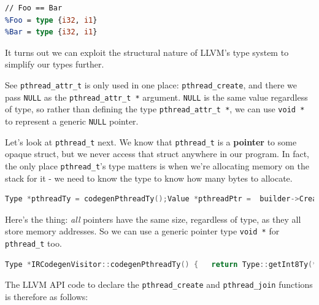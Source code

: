 
\begin{lstlisting}[language=llvm]
// Foo == Bar
%Foo = type {i32, i1}
%Bar = type {i32, i1}
\end{lstlisting}

It turns out we can exploit the structural nature of LLVM's type system
to simplify our types further.

See \texttt{pthread\_attr\_t} is only used in one place:
\texttt{pthread\_create}, and there we pass \texttt{NULL} as the
\texttt{pthread\_attr\_t\ *} argument. \texttt{NULL} is the same value
regardless of type, so rather than defining the type
\texttt{pthread\_attr\_t\ *}, we can use \texttt{void\ *} to represent a
generic \texttt{NULL} pointer.

Let's look at \texttt{pthread\_t} next. We know that \texttt{pthread\_t}
is a \textbf{pointer} to some opaque struct, but we never access that
struct anywhere in our program. In fact, the only place
\texttt{pthread\_t}'s type matters is when we're allocating memory on
the stack for it - we need to know the type to know how many bytes to
allocate.

%

\begin{lstlisting}[caption={expr\_codegen.cc},language=c++]
Type *pthreadTy = codegenPthreadTy();Value *pthreadPtr =  builder->CreateAlloca(pthreadTy, nullptr, "pthread");
\end{lstlisting}

Here's the thing: \emph{all} pointers have the same size, regardless of
type, as they all store memory addresses. So we can use a generic
pointer type \texttt{void\ *} for \texttt{pthread\_t} too.

%

\begin{lstlisting}[language=C++,caption={extern\_functions\_codegen.cc}]
Type *IRCodegenVisitor::codegenPthreadTy() {   return Type::getInt8Ty(*context)->getPointerTo();}
\end{lstlisting}

The LLVM API code to declare the \texttt{pthread\_create} and
\texttt{pthread\_join} functions is therefore as follows:

